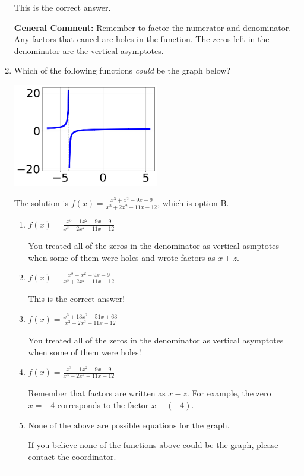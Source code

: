 \documentclass{extbook}[14pt]
\newcommand{\litem}[1]{\item #1

\rule{\textwidth}{0.4pt}}
\begin{document}
\begin{enumerate}
{\begin{enumerate}[label=\Alph*.]
This is the correct answer.
\end{enumerate}

\textbf{General Comment:} Remember to factor the numerator and denominator. Any factors that cancel are holes in the function. The zeros left in the denominator are the vertical asymptotes.
}
\litem{
Which of the following functions \textit{could} be the graph below?

\begin{center}
    \includegraphics[width=0.5\textwidth]{../Figures/identifyGraphOfRationalFunctionCopyA.png}
\end{center}




The solution is \( f(x)=\frac{x^{3} + x^{2} -9 x -9}{x^{3} +2 x^{2} -11 x -12} \), which is option B.\begin{enumerate}[label=\Alph*.]
\item \( f(x)=\frac{x^{3} -1 x^{2} -9 x + 9}{x^{3} -2 x^{2} -11 x + 12} \)

You treated all of the zeros in the denominator as vertical asmptotes when some of them were holes and wrote factors as $x+z$.
\item \( f(x)=\frac{x^{3} + x^{2} -9 x -9}{x^{3} +2 x^{2} -11 x -12} \)

This is the correct answer!
\item \( f(x)=\frac{x^{3} +13 x^{2} +51 x + 63}{x^{3} +2 x^{2} -11 x -12} \)

You treated all of the zeros in the denominator as vertical asymptotes when some of them were holes!
\item \( f(x)=\frac{x^{3} -1 x^{2} -9 x + 9}{x^{3} -2 x^{2} -11 x + 12} \)

Remember that factors are written as $x-z$. For example, the zero $x=-4$ corresponds to the factor $x-(-4)$.
\item \( \text{None of the above are possible equations for the graph.} \)

If you believe none of the functions above could be the graph, please contact the coordinator.
\end{enumerate}

}
\end{enumerate}
\end{document}
